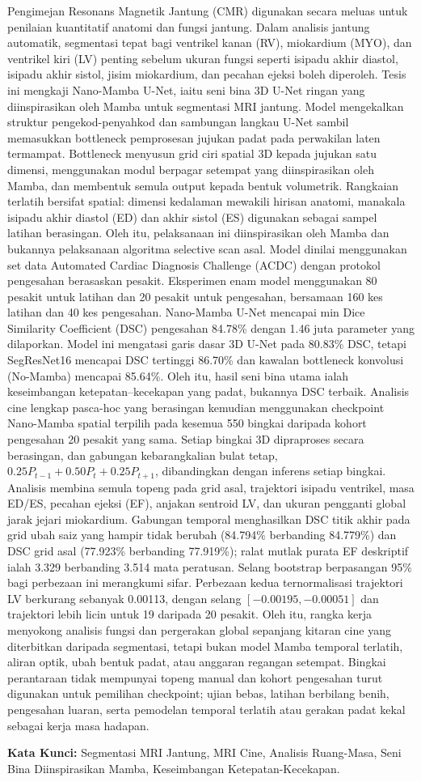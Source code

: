Pengimejan Resonans Magnetik Jantung (CMR) digunakan secara meluas untuk penilaian kuantitatif anatomi dan fungsi jantung. Dalam analisis jantung automatik, segmentasi tepat bagi ventrikel kanan (RV), miokardium (MYO), dan ventrikel kiri (LV) penting sebelum ukuran fungsi seperti isipadu akhir diastol, isipadu akhir sistol, jisim miokardium, dan pecahan ejeksi boleh diperoleh. Tesis ini mengkaji Nano-Mamba U-Net, iaitu seni bina 3D U-Net ringan yang diinspirasikan oleh Mamba untuk segmentasi MRI jantung. Model mengekalkan struktur pengekod-penyahkod dan sambungan langkau U-Net sambil memasukkan bottleneck pemprosesan jujukan padat pada perwakilan laten termampat. Bottleneck menyusun grid ciri spatial 3D kepada jujukan satu dimensi, menggunakan modul berpagar setempat yang diinspirasikan oleh Mamba, dan membentuk semula output kepada bentuk volumetrik. Rangkaian terlatih bersifat spatial: dimensi kedalaman mewakili hirisan anatomi, manakala isipadu akhir diastol (ED) dan akhir sistol (ES) digunakan sebagai sampel latihan berasingan. Oleh itu, pelaksanaan ini diinspirasikan oleh Mamba dan bukannya pelaksanaan algoritma selective scan asal. Model dinilai menggunakan set data Automated Cardiac Diagnosis Challenge (ACDC) dengan protokol pengesahan berasaskan pesakit. Eksperimen enam model menggunakan 80 pesakit untuk latihan dan 20 pesakit untuk pengesahan, bersamaan 160 kes latihan dan 40 kes pengesahan. Nano-Mamba U-Net mencapai min Dice Similarity Coefficient (DSC) pengesahan 84.78\% dengan 1.46 juta parameter yang dilaporkan. Model ini mengatasi garis dasar 3D U-Net pada 80.83\% DSC, tetapi SegResNet16 mencapai DSC tertinggi 86.70\% dan kawalan bottleneck konvolusi (No-Mamba) mencapai 85.64\%. Oleh itu, hasil seni bina utama ialah keseimbangan ketepatan--kecekapan yang padat, bukannya DSC terbaik. Analisis cine lengkap pasca-hoc yang berasingan kemudian menggunakan checkpoint Nano-Mamba spatial terpilih pada kesemua 550 bingkai daripada kohort pengesahan 20 pesakit yang sama. Setiap bingkai 3D dipraproses secara berasingan, dan gabungan kebarangkalian bulat tetap, $0.25P_{t-1}+0.50P_t+0.25P_{t+1}$, dibandingkan dengan inferens setiap bingkai. Analisis membina semula topeng pada grid asal, trajektori isipadu ventrikel, masa ED/ES, pecahan ejeksi (EF), anjakan sentroid LV, dan ukuran pengganti global jarak jejari miokardium. Gabungan temporal menghasilkan DSC titik akhir pada grid ubah saiz yang hampir tidak berubah (84.794\% berbanding 84.779\%) dan DSC grid asal (77.923\% berbanding 77.919\%); ralat mutlak purata EF deskriptif ialah 3.329 berbanding 3.514 mata peratusan. Selang bootstrap berpasangan 95\% bagi perbezaan ini merangkumi sifar. Perbezaan kedua ternormalisasi trajektori LV berkurang sebanyak 0.00113, dengan selang $[-0.00195,-0.00051]$ dan trajektori lebih licin untuk 19 daripada 20 pesakit. Oleh itu, rangka kerja menyokong analisis fungsi dan pergerakan global sepanjang kitaran cine yang diterbitkan daripada segmentasi, tetapi bukan model Mamba temporal terlatih, aliran optik, ubah bentuk padat, atau anggaran regangan setempat. Bingkai perantaraan tidak mempunyai topeng manual dan kohort pengesahan turut digunakan untuk pemilihan checkpoint; ujian bebas, latihan berbilang benih, pengesahan luaran, serta pemodelan temporal terlatih atau gerakan padat kekal sebagai kerja masa hadapan.

\vspace{1em}
\noindent
\textbf{Kata Kunci:} Segmentasi MRI Jantung, MRI Cine, Analisis Ruang-Masa, Seni Bina Diinspirasikan Mamba, Keseimbangan Ketepatan-Kecekapan.
